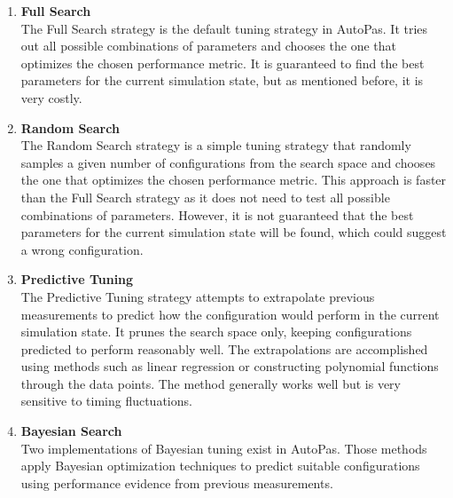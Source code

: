 \begin{enumerate}
      \item \textbf{Full Search} \\
            The Full Search strategy is the default tuning strategy in AutoPas. It tries out all possible combinations of parameters and chooses the one that optimizes the chosen performance metric. It is guaranteed to find the best parameters for the current simulation state, but as mentioned before, it is very costly.

      \item \textbf{Random Search} \\
            The Random Search strategy is a simple tuning strategy that randomly samples a given number of configurations from the search space and chooses the one that optimizes the chosen performance metric. This approach is faster than the Full Search strategy as it does not need to test all possible combinations of parameters. However, it is not guaranteed that the best parameters for the current simulation state will be found, which could suggest a wrong configuration.

      \item \textbf{Predictive Tuning} \\
            The Predictive Tuning strategy attempts to extrapolate previous measurements to predict how the configuration would perform in the current simulation state. It prunes the search space only, keeping configurations predicted to perform reasonably well. The extrapolations are accomplished using methods such as linear regression or constructing polynomial functions through the data points. The method generally works well but is very sensitive to timing fluctuations.

      \item \textbf{Bayesian Search} \\
            Two implementations of Bayesian tuning exist in AutoPas. Those methods apply Bayesian optimization techniques to predict suitable configurations using performance evidence from previous measurements.


\end{enumerate}
